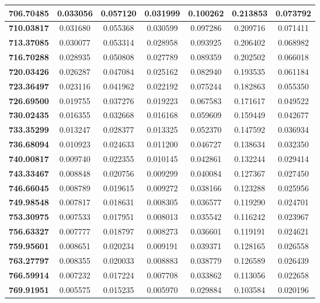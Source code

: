 \documentclass[10pt, a4paper]{article}
\begin{document}
\begin{appendices}
\begin{longtable}{|c|c|c|c|c|c|c|}
\textbf{706.70485} & 0.033056 & 0.057120 & 0.031999 & 0.100262 & 0.213853 & 0.073792 \\ \hline
\textbf{710.03817} & 0.031680 & 0.055368 & 0.030599 & 0.097286 & 0.209716 & 0.071411 \\ \hline
\textbf{713.37085} & 0.030077 & 0.053314 & 0.028958 & 0.093925 & 0.206402 & 0.068982 \\ \hline
\textbf{716.70288} & 0.028935 & 0.050808 & 0.027789 & 0.089359 & 0.202502 & 0.066018 \\ \hline
\textbf{720.03426} & 0.026287 & 0.047084 & 0.025162 & 0.082940 & 0.193535 & 0.061184 \\ \hline
\textbf{723.36497} & 0.023116 & 0.041962 & 0.022192 & 0.075244 & 0.182863 & 0.055350 \\ \hline
\textbf{726.69500} & 0.019755 & 0.037276 & 0.019223 & 0.067583 & 0.171617 & 0.049522 \\ \hline
\textbf{730.02435} & 0.016355 & 0.032668 & 0.016168 & 0.059609 & 0.159449 & 0.042677 \\ \hline
\textbf{733.35299} & 0.013247 & 0.028377 & 0.013325 & 0.052370 & 0.147592 & 0.036934 \\ \hline
\textbf{736.68094} & 0.010923 & 0.024633 & 0.011200 & 0.046727 & 0.138634 & 0.032350 \\ \hline
\textbf{740.00817} & 0.009740 & 0.022355 & 0.010145 & 0.042861 & 0.132244 & 0.029414 \\ \hline
\textbf{743.33467} & 0.008848 & 0.020756 & 0.009299 & 0.040084 & 0.127367 & 0.027450 \\ \hline
\textbf{746.66045} & 0.008789 & 0.019615 & 0.009272 & 0.038166 & 0.123288 & 0.025956 \\ \hline
\textbf{749.98548} & 0.007817 & 0.018631 & 0.008305 & 0.036577 & 0.119290 & 0.024701 \\ \hline
\textbf{753.30975} & 0.007533 & 0.017951 & 0.008013 & 0.035542 & 0.116242 & 0.023967 \\ \hline
\textbf{756.63327} & 0.007777 & 0.018797 & 0.008273 & 0.036601 & 0.119191 & 0.024621 \\ \hline
\textbf{759.95601} & 0.008651 & 0.020234 & 0.009191 & 0.039371 & 0.128165 & 0.026558 \\ \hline
\textbf{763.27797} & 0.008355 & 0.020033 & 0.008883 & 0.038779 & 0.126589 & 0.026439 \\ \hline
\textbf{766.59914} & 0.007232 & 0.017224 & 0.007708 & 0.033862 & 0.113056 & 0.022658 \\ \hline
\textbf{769.91951} & 0.005575 & 0.015235 & 0.005970 & 0.029884 & 0.103584 & 0.020196 \\ \hline

\end{longtable}
\end{appendices}
\end{document}
